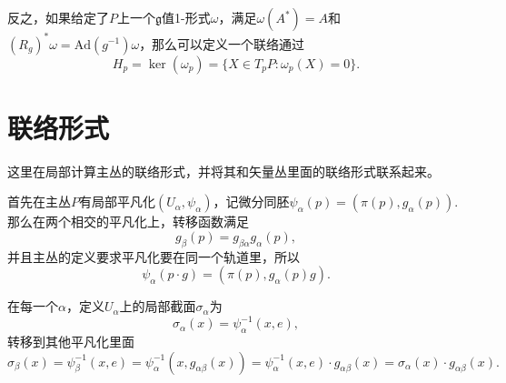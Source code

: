 反之，如果给定了$P$上一个$\mathfrak{g}$值1-形式$\omega$，满足$\omega(A^*)=A$和$(R_g)^*\omega=\mathrm{Ad}(g^{-1})\omega$，那么可以定义一个联络通过
\[
	H_p=\ker(\omega_p)=\{X\in T_p P:\omega_p(X)=0\}.
\]
\section{联络形式}
这里在局部计算主丛的联络形式，并将其和矢量丛里面的联络形式联系起来。

首先在主丛$P$有局部平凡化$(U_\alpha,\psi_\alpha)$，记微分同胚$\psi_\alpha(p)=(\pi(p),g_\alpha(p))$.那么在两个相交的平凡化上，转移函数满足
\[
	g_\beta(p)=g_{\beta\alpha}g_\alpha(p),
\]
并且主丛的定义要求平凡化要在同一个轨道里，所以
\[
	\psi_\alpha(p\cdot g)=(\pi(p),g_\alpha(p)g).
\]

在每一个$\alpha$，定义$U_\alpha$上的局部截面$\sigma_\alpha$为
\[
	\sigma_\alpha(x)=\psi_\alpha^{-1}(x,e),
\]
转移到其他平凡化里面
\[
	\sigma_\beta(x)=\psi_\beta^{-1}(x,e)=\psi_\alpha^{-1}(x,g_{\alpha\beta}(x))=\psi_\alpha^{-1}(x,e)\cdot g_{\alpha\beta}(x)=\sigma_\alpha(x)\cdot g_{\alpha\beta}(x).
\]

